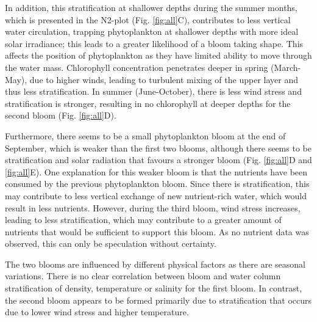 \documentclass[../Main.tex]{subfiles}
\begin{document}
In addition, this stratification at shallower depths during the summer months, which is presented in the N2-plot (Fig. \ref{fig:all}C), contributes to less vertical water circulation, trapping phytoplankton at shallower depths with more ideal solar irradiance; this leads to a greater likelihood of a bloom taking shape. This affects the position of phytoplankton as they have limited ability to move through the water mass\supercite{kase2018phytoplankton}.
Chlorophyll concentration penetrates deeper in spring (March-May), due to higher winds, leading to turbulent mixing of the upper layer and thus less stratification. In summer (June-October), there is less wind stress and stratification is stronger, resulting in no chlorophyll at deeper depths for the second bloom (Fig. \ref{fig:all}D).

Furthermore, there seems to be a small phytoplankton bloom at the end of September, which is weaker than the first two blooms, although there seems to be stratification and solar radiation that favours a stronger bloom (Fig. \ref{fig:all}D and \ref{fig:all}E). One explanation for this weaker bloom is that the nutrients have been consumed by the previous phytoplankton bloom. Since there is stratification, this may contribute to less vertical exchange of new nutrient-rich water, which would result in less nutrients. However, during the third bloom, wind stress increases, leading to less stratification, which may contribute to a greater amount of nutrients that would be sufficient to support this bloom.  As no nutrient data was observed, this can only be speculation without certainty. 

The two blooms are influenced by different physical factors as there are seasonal variations. There is no clear correlation between bloom and water column stratification of density, temperature or salinity for the first bloom. In contrast, the second bloom appears to be formed primarily due to stratification that occurs due to lower wind stress and higher temperature.





\end{document}
